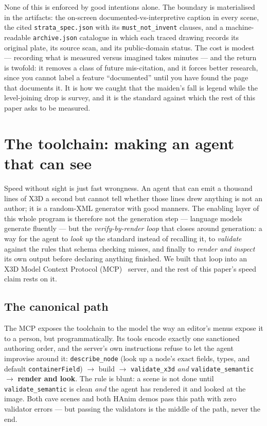 \documentclass[11pt]{article}
\begin{document}
None of this is enforced by good intentions alone. The boundary is materialised in the artifacts: the on-screen documented-vs-interpretive caption in every scene, the cited \texttt{strata\_spec.json} with its \texttt{must\_not\_invent} clauses, and a machine-readable \texttt{archive.json} catalogue in which each traced drawing records its original plate, its source scan, and its public-domain status. The cost is modest --- recording what is measured versus imagined takes minutes --- and the return is twofold: it removes a class of future mis-citation, and it forces better research, since you cannot label a feature ``documented'' until you have found the page that documents it. It is how we caught that the maiden's fall is legend while the level-joining drop is survey, and it is the standard against which the rest of this paper asks to be measured.

\section{The toolchain: making an agent that can see}\label{sec:toolchain}

Speed without sight is just fast wrongness. An agent that can emit a thousand lines of X3D a second but cannot tell whether those lines drew anything is not an author; it is a random-XML generator with good manners. The enabling layer of this whole program is therefore not the generation step --- language models generate fluently --- but the \emph{verify-by-render loop} that closes around generation: a way for the agent to \emph{look up} the standard instead of recalling it, to \emph{validate} against the rules that schema checking misses, and finally to \emph{render and inspect} its own output before declaring anything finished. We built that loop into an X3D Model Context Protocol (MCP)~\cite{mcp} server, and the rest of this paper's speed claim rests on it.

\subsection{The canonical path}

The MCP exposes the toolchain to the model the way an editor's menus expose it to a person, but programmatically. Its tools encode exactly one sanctioned authoring order, and the server's own instructions refuse to let the agent improvise around it:
\texttt{describe\_node} (look up a node's exact fields, types, and default \texttt{containerField}) $\rightarrow$ build $\rightarrow$ \texttt{validate\_x3d} \emph{and} \texttt{validate\_semantic} $\rightarrow$ \textbf{render and look}. The rule is blunt: a scene is not done until \texttt{validate\_semantic} is clean \emph{and} the agent has rendered it and looked at the image. Both cave scenes and both HAnim demos pass this path with zero validator errors --- but passing the validators is the middle of the path, never the end.
\end{document}

